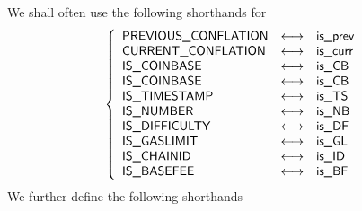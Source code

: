 We shall often use the following shorthands for
\[
	\left\{ \begin{array}{lcl}
		\textsf{PREVIOUS\_CONFLATION} & \longleftrightarrow & \textsf{is\_prev}   \\
		\textsf{CURRENT\_CONFLATION}  & \longleftrightarrow & \textsf{is\_curr}   \\
		\textsf{IS\_COINBASE}         & \longleftrightarrow & \textsf{is\_CB}   \\
		\textsf{IS\_COINBASE}         & \longleftrightarrow & \textsf{is\_CB}   \\
		\textsf{IS\_TIMESTAMP}        & \longleftrightarrow & \textsf{is\_TS}  \\
		\textsf{IS\_NUMBER}           & \longleftrightarrow & \textsf{is\_NB}     \\
		\textsf{IS\_DIFFICULTY}       & \longleftrightarrow & \textsf{is\_DF} \\
		\textsf{IS\_GASLIMIT}         & \longleftrightarrow & \textsf{is\_GL}   \\
		\textsf{IS\_CHAINID}          & \longleftrightarrow & \textsf{is\_ID}    \\
		\textsf{IS\_BASEFEE}          & \longleftrightarrow & \textsf{is\_BF}    \\
	\end{array} \right.
\]
\noindent We further define the following shorthands

